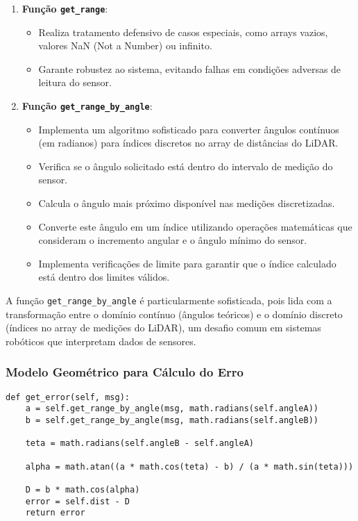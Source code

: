 \begin{enumerate}
    \item \textbf{Função \texttt{get\_range}}:
          \begin{itemize}
              \item Realiza tratamento defensivo de casos especiais, como arrays vazios, valores
                    NaN (Not a Number) ou infinito.
              \item Garante robustez ao sistema, evitando falhas em condições adversas de leitura
                    do sensor.
          \end{itemize}

    \item \textbf{Função \texttt{get\_range\_by\_angle}}:
          \begin{itemize}
              \item Implementa um algoritmo sofisticado para converter ângulos contínuos (em
                    radianos) para índices discretos no array de distâncias do LiDAR.
              \item Verifica se o ângulo solicitado está dentro do intervalo de medição do sensor.
              \item Calcula o ângulo mais próximo disponível nas medições discretizadas.
              \item Converte este ângulo em um índice utilizando operações matemáticas que
                    consideram o incremento angular e o ângulo mínimo do sensor.
              \item Implementa verificações de limite para garantir que o índice calculado está
                    dentro dos limites válidos.
          \end{itemize}
\end{enumerate}

A função \texttt{get\_range\_by\_angle} é particularmente sofisticada, pois
lida com a transformação entre o domínio contínuo (ângulos teóricos) e o
domínio discreto (índices no array de medições do LiDAR), um desafio comum em
sistemas robóticos que interpretam dados de sensores.

\subsubsection{Modelo Geométrico para Cálculo do Erro}

\begin{verbatim}
def get_error(self, msg):
    a = self.get_range_by_angle(msg, math.radians(self.angleA))
    b = self.get_range_by_angle(msg, math.radians(self.angleB))

    teta = math.radians(self.angleB - self.angleA)

    alpha = math.atan((a * math.cos(teta) - b) / (a * math.sin(teta)))

    D = b * math.cos(alpha)
    error = self.dist - D
    return error
\end{verbatim}

